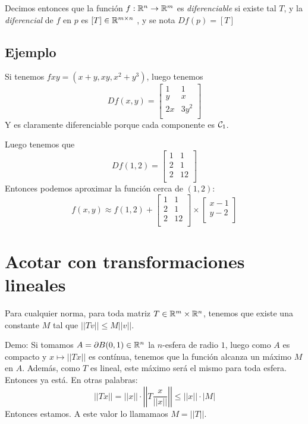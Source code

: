 \documentclass{article}
\begin{document}
Decimos entonces que la función $f:\mathbb{R}^n \to \mathbb{R}^m$ es \emph{diferenciable} si existe tal $T$, y la \emph{diferencial} de $f$ en $p$ es $[T] \in \mathbb{R}^{m \times n}$
, y se nota $Df(p) = [T]$

\subsection*{Ejemplo}
Si tenemos $fxy = (x+y, xy, x^2 + y^3)$, luego tenemos
\[Df(x, y) = 
\begin{bmatrix}
	1 & 1 \\
	y & x \\
	2x & 3y^2 \\
\end{bmatrix}\]
Y es claramente diferenciable porque cada componente es $\mathcal{C}_1$.

Luego tenemos que
\[Df(1, 2) = 
\begin{bmatrix}
	1 & 1 \\
	2 & 1 \\
	2 & 12 \\
\end{bmatrix}\]
Entonces podemos aproximar la función cerca de $(1, 2)$:
\[
	f(x,y) \approx f(1, 2) + 
\begin{bmatrix}
	1 & 1 \\
	2 & 1 \\
	2 & 12 \\
\end{bmatrix} \times
\begin{bmatrix}
	x - 1 \\
	y - 2 \\
\end{bmatrix}
\]

\section*{Acotar con transformaciones lineales}
Para cualquier norma, para toda matriz $T \in \mathbb{R}^m \times \mathbb{R}^n$, tenemos que existe una constante $M$ tal que $||Tv|| \leq M ||v||$.

Demo:
Si tomamos $A = \partial B(0, 1) \in \mathbb{R}^n$ la $n$-esfera de radio $1$, luego como $A$ es compacto y $x \mapsto ||Tx||$ es contínua, tenemos que la función alcanza un máximo $M$ en $A$. Además, como $T$ es lineal, este máximo será el mismo para toda esfera. Entonces ya está. En otras palabras:
\[||Tx|| = ||x|| \cdot \left|\left|T\frac{x}{||x||}\right|\right| \leq ||x|| \cdot |M|\]
Entonces estamos. A este valor lo llamamaos $M = ||T||$.
\end{document}
